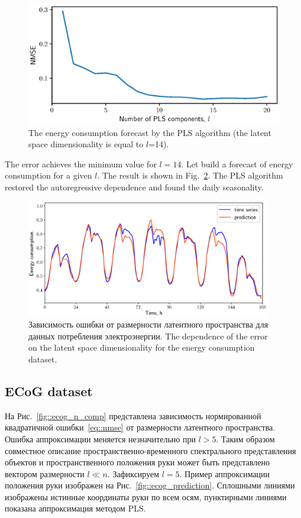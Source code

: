 \documentclass[12pt,twoside]{article}
\begin{document}
\begin{figure}[!h]
	\centering
	\includegraphics[width=0.75\linewidth]{figs/energy_n_comp}
	\caption{The energy consumption forecast by the PLS algorithm (the latent space dimensionality is equal to $l$=14).}
	\label{fig::energy_n_comp}
\end{figure}

\hrulefill

The error achieves the minimum value for $l=14$. 
Let build a forecast of energy consumption for a given $l$. 
The result is shown in Fig.~\ref{fig::energy_prediction}. 
The PLS algorithm restored the autoregressive dependence and found the daily seasonality.

\begin{figure}[!h]
	\centering
	\includegraphics[width=0.95\textwidth]{figs/energy_prediction}
	\caption{Зависимость ошибки от размерности латентного пространства для данных потребления электроэнергии. The dependence of the error on the latent space dimensionality for the energy consumption dataset.}
	\label{fig::energy_prediction}
\end{figure}

\subsection{ECoG dataset}

На Рис.~\ref{fig::ecog_n_comp} представлена зависимость нормированной квадратичной ошибки~\eqref{eq::nmse} от размерности латентного пространства. Ошибка аппроксимации меняется незначительно при $l > 5$.
Таким образом совместное описание пространственно-временного спектрального представления объектов и пространственного положения руки может быть представлено вектором размерности $l \ll n$.
Зафиксируем $l = 5$. 
Пример аппроксимации положения руки изображен на Рис.~\ref{fig::ecog_prediction}. 
Сплошными линиями изображены истинные координаты руки по всем осям, пунктирными линиями показана аппроксимация методом PLS.
\end{document}
